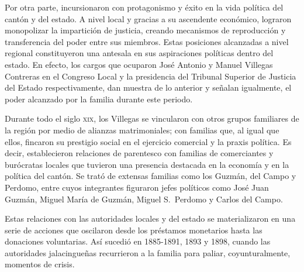\documentclass[14pt,twoside,final]{extbook} %
\begin{document}
Por otra parte, incursionaron con protagonismo y éxito en la vida política del cantón y del estado. A nivel local y gracias a su ascendente económico, lograron monopolizar la impartición de justicia, creando mecanismos de reproducción y transferencia del poder entre sus miembros. Estas posiciones alcanzadas a nivel regional constituyeron una antesala en sus aspiraciones políticas dentro del estado. En efecto, los cargos que ocuparon José Antonio y Manuel Villegas Contreras en el Congreso Local y la presidencia del Tribunal Superior de Justicia del Estado respectivamente, dan muestra de lo anterior y señalan igualmente, el poder alcanzado por la familia durante este periodo.

Durante todo el siglo \textsc{xix}, los Villegas se vincularon con otros grupos familiares de la región por medio de alianzas matrimoniales; con familias que, al igual que ellos, fincaron su prestigio social en el ejercicio comercial y la praxis política. Es decir, establecieron relaciones de parentesco con familias de comerciantes y burócratas locales que tuvieron una presencia destacada en la economía y en la política del cantón. Se trató de extensas familias como los Guzmán, del Campo y Perdomo, entre cuyos integrantes figuraron jefes políticos como José Juan Guzmán, Miguel María de Guzmán, Miguel S.~Perdomo y Carlos del Campo.

Estas relaciones con las autoridades locales y del estado se materializaron en una serie de acciones que oscilaron desde los préstamos monetarios hasta las donaciones voluntarias. Así sucedió en 1885-1891, 1893 y 1898, cuando las autoridades jalacingueñas recurrieron a la familia para paliar, coyunturalmente, momentos de crisis.
\end{document}
